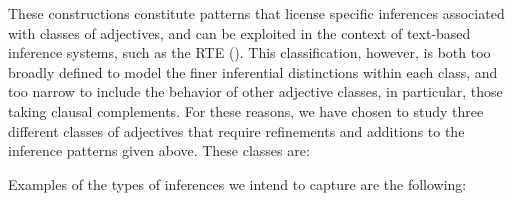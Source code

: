 \documentclass[10pt]{article}
\begin{document}
\noindent These constructions   constitute  patterns that license specific inferences associated with classes of adjectives, and  can be exploited  
 in the context  of text-based inference systems, such as the RTE (\cite{amoia2006adjective}). 
This classification, however, is both too broadly defined to model the finer inferential distinctions  within each class, and too narrow to include the behavior of other adjective classes, in particular, those taking clausal complements. 
For these reasons, we have chosen to study three different classes of adjectives that  require refinements and additions to the inference patterns given above. These classes are:



Examples of the types of inferences we intend to capture are the following:
\end{document}
